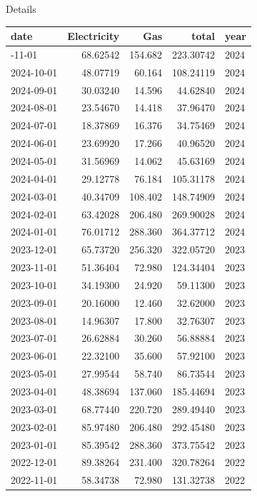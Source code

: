 \documentclass[
  letterpaper,
  DIV=11,
  numbers=noendperiod]{scrartcl}
\begin{document}
Details

\label{tbl-emissions}
\begin{longtable}[]{@{}lrrrl@{}}
\toprule\noalign{}
date & Electricity & Gas & total & year \\
\midrule\noalign{}
\endhead
\bottomrule\noalign{}
\endlastfoot
2024-11-01 & 68.62542 & 154.682 & 223.30742 & 2024 \\
2024-10-01 & 48.07719 & 60.164 & 108.24119 & 2024 \\
2024-09-01 & 30.03240 & 14.596 & 44.62840 & 2024 \\
2024-08-01 & 23.54670 & 14.418 & 37.96470 & 2024 \\
2024-07-01 & 18.37869 & 16.376 & 34.75469 & 2024 \\
2024-06-01 & 23.69920 & 17.266 & 40.96520 & 2024 \\
2024-05-01 & 31.56969 & 14.062 & 45.63169 & 2024 \\
2024-04-01 & 29.12778 & 76.184 & 105.31178 & 2024 \\
2024-03-01 & 40.34709 & 108.402 & 148.74909 & 2024 \\
2024-02-01 & 63.42028 & 206.480 & 269.90028 & 2024 \\
2024-01-01 & 76.01712 & 288.360 & 364.37712 & 2024 \\
2023-12-01 & 65.73720 & 256.320 & 322.05720 & 2023 \\
2023-11-01 & 51.36404 & 72.980 & 124.34404 & 2023 \\
2023-10-01 & 34.19300 & 24.920 & 59.11300 & 2023 \\
2023-09-01 & 20.16000 & 12.460 & 32.62000 & 2023 \\
2023-08-01 & 14.96307 & 17.800 & 32.76307 & 2023 \\
2023-07-01 & 26.62884 & 30.260 & 56.88884 & 2023 \\
2023-06-01 & 22.32100 & 35.600 & 57.92100 & 2023 \\
2023-05-01 & 27.99544 & 58.740 & 86.73544 & 2023 \\
2023-04-01 & 48.38694 & 137.060 & 185.44694 & 2023 \\
2023-03-01 & 68.77440 & 220.720 & 289.49440 & 2023 \\
2023-02-01 & 85.97480 & 206.480 & 292.45480 & 2023 \\
2023-01-01 & 85.39542 & 288.360 & 373.75542 & 2023 \\
2022-12-01 & 89.38264 & 231.400 & 320.78264 & 2022 \\
2022-11-01 & 58.34738 & 72.980 & 131.32738 & 2022 \\

\end{longtable}
\end{document}
